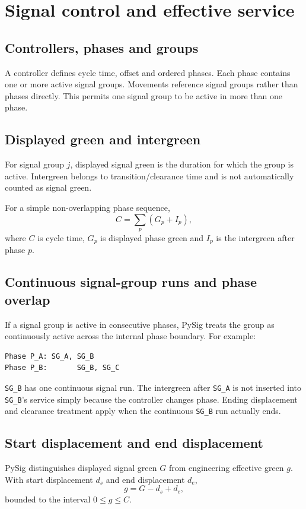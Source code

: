 \chapter{Signal control and effective service}
\label{chap:signal-control}

\section{Controllers, phases and groups}
A controller defines cycle time, offset and ordered phases.  Each phase contains one or
more active signal groups.  Movements reference signal groups rather than phases
directly.  This permits one signal group to be active in more than one phase.

\section{Displayed green and intergreen}
For signal group $j$, displayed signal green is the duration for which the group is
active.  Intergreen belongs to transition/clearance time and is not automatically
counted as signal green.

For a simple non-overlapping phase sequence,
\begin{equation}
C=\sum_p(G_p+I_p),
\end{equation}
where $C$ is cycle time, $G_p$ is displayed phase green and $I_p$ is the intergreen
after phase $p$.

\section{Continuous signal-group runs and phase overlap}
If a signal group is active in consecutive phases, PySig treats the group as
continuously active across the internal phase boundary.  For example:

\begin{verbatim}
Phase P_A: SG_A, SG_B
Phase P_B:       SG_B, SG_C
\end{verbatim}

\texttt{SG\_B} has one continuous signal run.  The intergreen after \texttt{SG\_A} is not inserted into
\texttt{SG\_B}'s service simply because the controller changes phase.  Ending displacement and
clearance treatment apply when the continuous \texttt{SG\_B} run actually ends.

\section{Start displacement and end displacement}
PySig distinguishes displayed signal green $G$ from engineering effective green $g$.
With start displacement $d_s$ and end displacement $d_e$,
\begin{equation}
g=G-d_s+d_e,
\end{equation}
bounded to the interval $0\leq g\leq C$.

